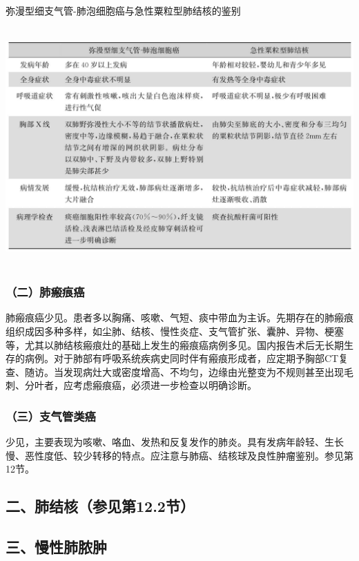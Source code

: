 \begin{table}[htbp]
\centering
\caption{弥漫型细支气管-肺泡细胞癌与急性粟粒型肺结核的鉴别}
\label{tab5-3}
\includegraphics[width=5.91667in,height=3.58333in]{./images/Image00046.jpg}
\end{table}

\subsubsection{（二）肺瘢痕癌}

肺瘢痕癌少见。患者多以胸痛、咳嗽、气短、痰中带血为主诉。先期存在的肺瘢痕组织成因多种多样，如尘肺、结核、慢性炎症、支气管扩张、囊肿、异物、梗塞等，尤其以肺结核瘢痕灶的基础上发生的瘢痕癌病例多见。国内报告术后无长期生存的病例。对于肺部有呼吸系统疾病史同时伴有瘢痕形成者，应定期予胸部CT复查、随访。当发现病灶大或密度增高、不均匀，边缘由光整变为不规则甚至出现毛刺、分叶者，应考虑瘢痕癌，必须进一步检查以明确诊断。

\subsubsection{（三）支气管类癌}

少见，主要表现为咳嗽、咯血、发热和反复发作的肺炎。具有发病年龄轻、生长慢、恶性度低、较少转移的特点。应注意与肺癌、结核球及良性肿瘤鉴别。参见第12节。

\subsection{二、肺结核（参见第12.2节）}

\subsection{三、慢性肺脓肿}

